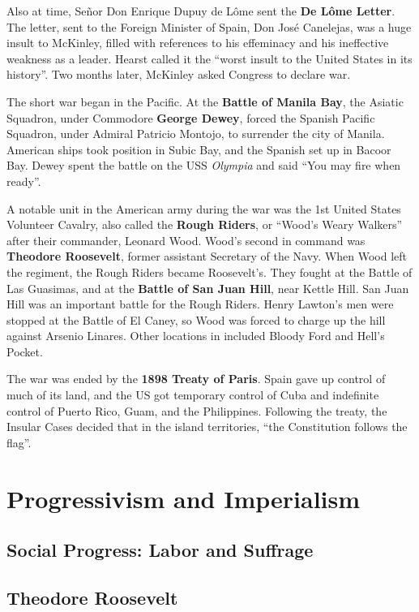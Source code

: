Also at time, Se\~nor Don Enrique Dupuy de L\^ome sent the \textbf{De L\^ome Letter}.
The letter, sent to the Foreign Minister of Spain, Don Jos\'e Canelejas, was a huge insult to McKinley,
filled with references to his effeminacy and his ineffective weakness as a leader.
Hearst called it the ``worst insult to the United States in its history''.
Two months later, McKinley asked Congress to declare war.

The short war began in the Pacific.
At the \textbf{Battle of Manila Bay},
the Asiatic Squadron, under Commodore \textbf{George Dewey},
forced the Spanish Pacific Squadron, under Admiral Patricio Montojo,
to surrender the city of Manila.
American ships took position in Subic Bay, and the Spanish set up in Bacoor Bay.
Dewey spent the battle on the USS \textit{Olympia} and said ``You may fire when ready''.

A notable unit in the American army during the war was the 1st United States Volunteer Cavalry,
also called the \textbf{Rough Riders}, or ``Wood's Weary Walkers'' after their commander, Leonard Wood.
Wood's second in command was \textbf{Theodore Roosevelt}, former assistant Secretary of the Navy.
When Wood left the regiment, the Rough Riders became Roosevelt's.
They fought at the Battle of Las Guasimas, and at the \textbf{Battle of San Juan Hill}, near Kettle Hill.
San Juan Hill was an important battle for the Rough Riders.
Henry Lawton's men were stopped at the Battle of El Caney,
so Wood was forced to charge up the hill against Arsenio Linares.
Other locations in included Bloody Ford and Hell's Pocket.

The war was ended by the \textbf{1898 Treaty of Paris}.
Spain gave up control of much of its land,
and the US got temporary control of Cuba and indefinite control of Puerto Rico, Guam, and the Philippines.
Following the treaty, the Insular Cases decided that in the island territories, ``the Constitution follows the flag''.

\section{Progressivism and Imperialism}

\subsection*{Social Progress: Labor and Suffrage}

\subsection*{Theodore Roosevelt}

